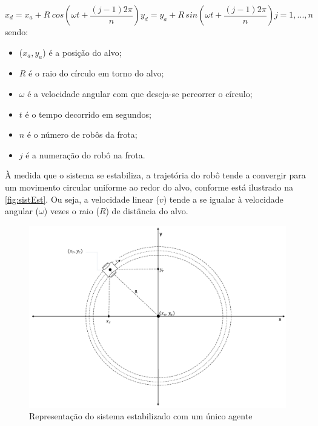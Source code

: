 \begin{subequations}
\begin{equation}
x_{d} = x_{a} + R\hspace{3pt}cos\left(\omega t + \dfrac{(j-1)2\pi}{n}\right)
\label{eq:xd_p2}
\end{equation}
\begin{equation}
y_{d} = y_{a} + R\hspace{2pt}sin\left(\omega t + \dfrac{(j-1)2\pi}{n}\right)
\label{eq:yd_p2}
\end{equation}
\begin{equation}
j = {1,...,n}
\label{eq:defj}
\end{equation}
\label{eq:posDesejada_p2}
\end{subequations}
sendo:
\begin{itemize}
	\item ($x_{a},y_{a}$) é a posição do alvo;
	\item $R$ é o raio do círculo em torno do alvo;
	\item $\omega$ é a velocidade angular com que deseja-se percorrer o círculo;
	\item $t$ é o tempo decorrido em segundos;
	\item $n$ é o número de robôs da frota;
	\item $j$ é a numeração do robô na frota. 
\end{itemize}

À medida que o sistema se estabiliza, a trajetória do robô tende a convergir para um movimento circular uniforme ao redor do alvo, conforme está ilustrado na \autoref{fig:sistEst}. Ou seja, a velocidade linear ($v$) tende a se igualar à velocidade angular ($\omega$) vezes o raio ($R$) de distância do alvo. 

\begin{figure}[!htb]
	\centering
	\includegraphics[width=1.0\textwidth]{./04-figuras/sistEstavel2}
	\caption{Representação do sistema estabilizado com um único agente}
	\label{fig:sistEst}
\end{figure}





